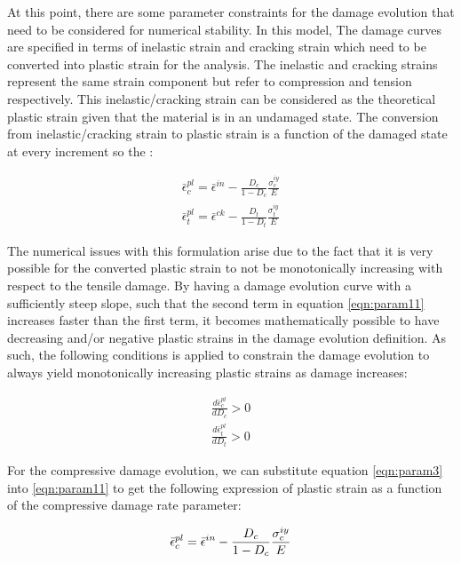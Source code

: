 At this point, there are some parameter constraints for the damage evolution that need to be considered for numerical stability. In this model, The damage curves are specified in terms of inelastic strain and cracking strain which need to be converted into plastic strain for the analysis. The inelastic and cracking strains represent the same strain component but refer to compression and tension respectively. This inelastic/cracking strain can be considered as the theoretical plastic strain given that the material is in an undamaged state. The conversion from inelastic/cracking strain to plastic strain is a function of the damaged state at every increment so the :

\begin{equation}
\label{eqn:param11}
\begin{array}{c}
\bar{\epsilon}_{c}^{pl}=\bar{\epsilon}^{in}-\frac{D_{c}}{1-D_{c}}\frac{\sigma_{c}^{iy}}{E}\\
\bar{\epsilon}_{t}^{pl}=\bar{\epsilon}^{ck}-\frac{D_{t}}{1-D_{t}}\frac{\sigma_{t}^{iy}}{E}
\end{array}
\end{equation}


The numerical issues with this formulation arise due to the fact that it is very possible for the converted plastic strain to not be monotonically increasing with respect to the tensile damage. By having a damage evolution curve with a sufficiently steep slope, such that the second term in equation \ref{eqn:param11} increases faster than the first term, it becomes mathematically possible to have decreasing and/or negative plastic strains in the damage evolution definition. As such, the following conditions is applied to constrain the damage evolution to always yield monotonically increasing plastic strains as damage increases:

\begin{equation}
\label{eqn:param6-1}
\begin{array}{c}
\frac{d\bar{\epsilon}_{c}^{pl}}{dD_{c}}>0\\
\frac{d\bar{\epsilon}_{t}^{pl}}{dD_{t}}>0
\end{array}
\end{equation}


For the compressive damage evolution, we can substitute equation \ref{eqn:param3} into \ref{eqn:param11} to get the following expression of plastic strain as a function of the compressive damage rate parameter:

\begin{equation}
\bar{\epsilon}_{c}^{pl}=\bar{\epsilon}^{in}-\frac{D_{c}}{1-D_{c}}\frac{\sigma_{c}^{iy}}{E}\\
\label{eqn:param12}
\end{equation}

